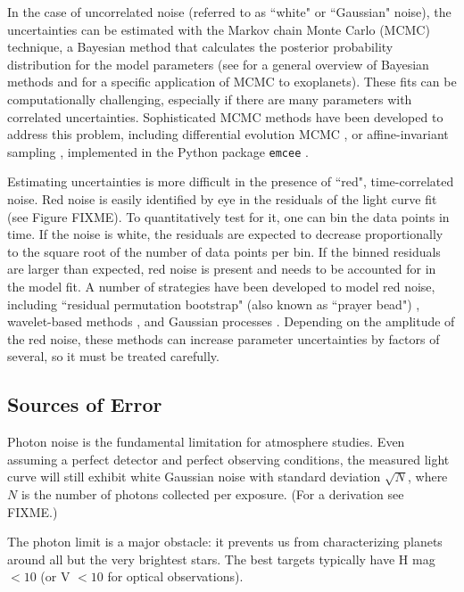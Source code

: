 \documentclass[graybox,natbib,nosecnum]{svmult}
\begin{document}
In the case of uncorrelated noise (referred to as ``white" or ``Gaussian" noise), the uncertainties can be estimated with the Markov chain Monte Carlo (MCMC) technique, a Bayesian method that calculates the posterior probability distribution for the model parameters (see \citealt{sivia96} for a general overview of Bayesian methods and \citealt{ford05} for a specific application of MCMC to exoplanets). These fits can be computationally challenging, especially if there are many parameters with correlated uncertainties. Sophisticated MCMC methods have been developed to address this problem, including differential evolution MCMC \citep{braak06}, or affine-invariant sampling \citep{goodman10}, implemented in the Python package \texttt{emcee} \citep{foremanmackey13}.

Estimating uncertainties is more difficult in the presence of ``red", time-correlated noise. Red noise is easily identified by eye in the residuals of the light curve fit (see Figure FIXME). To quantitatively test for it, one can bin the data points in time. If the noise is white, the residuals are expected to decrease proportionally to the square root of the number of data points per bin. If the binned residuals are larger than expected, red noise is present and needs to be accounted for in the model fit.  A number of strategies have been developed to model red noise, including ``residual permutation bootstrap" (also known as ``prayer bead")  \citep{FIXME}, wavelet-based methods \citep{carter09}, and Gaussian processes \citep{rasmussen05}. Depending on the amplitude of the red noise, these methods can increase parameter uncertainties by factors of several, so it must be treated carefully.

\subsection{Sources of Error}

Photon noise is the fundamental limitation for atmosphere studies. Even assuming a perfect detector and perfect observing conditions, the measured light curve will still exhibit white Gaussian noise with standard deviation $\sqrt{N}$, where $N$ is the number of photons collected per exposure. (For a derivation see FIXME.) 

The photon limit is a major obstacle: it prevents us from characterizing planets around all but the very brightest stars.  The best targets typically have H mag $< 10$ (or V $< 10$ for optical observations).  
\end{document}
